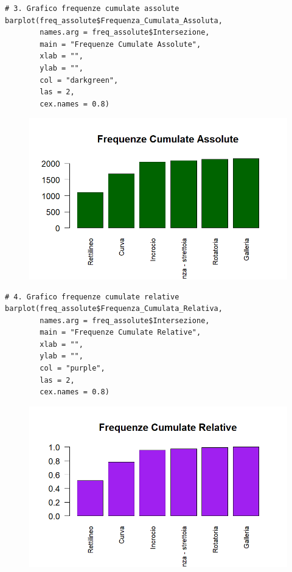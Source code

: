 \documentclass[14pt, openany, titlepage]{report} %
\begin{document}
\begin{center}
\begin{lstlisting}[breaklines=true]
# 3. Grafico frequenze cumulate assolute
barplot(freq_assolute$Frequenza_Cumulata_Assoluta, 
        names.arg = freq_assolute$Intersezione,
        main = "Frequenze Cumulate Assolute",
        xlab = "",
        ylab = "",
        col = "darkgreen",
        las = 2,
        cex.names = 0.8)
\end{lstlisting}  
\end{center}

\begin{figure}[H] %
    \centering
    \includegraphics[width=12cm, height=7cm]{Rplot04.png} %
\end{figure}

\begin{center}
\begin{lstlisting}[breaklines=true]
# 4. Grafico frequenze cumulate relative
barplot(freq_assolute$Frequenza_Cumulata_Relativa, 
        names.arg = freq_assolute$Intersezione,
        main = "Frequenze Cumulate Relative",
        xlab = "",
        ylab = "",
        col = "purple",
        las = 2,
        cex.names = 0.8)
\end{lstlisting}  
\end{center}

\begin{figure}[H] %
    \centering
    \includegraphics[width=12cm, height=7cm]{Rplot05.png} %
\end{figure}
\end{document}
